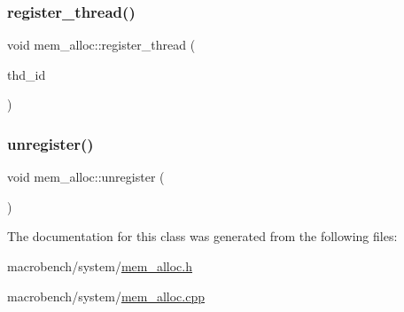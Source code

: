 \subsubsection{\texorpdfstring{register\+\_\+thread()}{register\_thread()}}
{\footnotesize\ttfamily void mem\+\_\+alloc\+::register\+\_\+thread (\begin{DoxyParamCaption}\item[{int}]{thd\+\_\+id }\end{DoxyParamCaption})}

\mbox{\label{classmem__alloc_a870a6fc38edd0ca50d4ef29d1b7014b9}} 
\subsubsection{\texorpdfstring{unregister()}{unregister()}}
{\footnotesize\ttfamily void mem\+\_\+alloc\+::unregister (\begin{DoxyParamCaption}{ }\end{DoxyParamCaption})}



The documentation for this class was generated from the following files\+:\begin{DoxyCompactItemize}
\item 
macrobench/system/\hyperlink{mem__alloc_8h}{mem\+\_\+alloc.\+h}\item 
macrobench/system/\hyperlink{mem__alloc_8cpp}{mem\+\_\+alloc.\+cpp}\end{DoxyCompactItemize}

